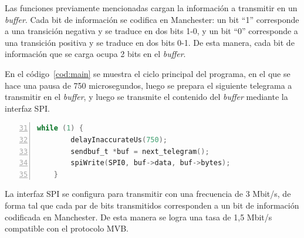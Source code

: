 Las funciones previamente mencionadas cargan la información a transmitir en un \textit{buffer}. Cada bit de información se codifica en Manchester: un bit ``1'' corresponde a una transición negativa y se traduce en dos bits 1-0, y un bit ``0'' corresponde a una transición positiva y se traduce en dos bits 0-1. De esta manera, cada bit de información que se carga ocupa 2 bits en el \textit{buffer}.

En el código~\ref{cod:main} se muestra el ciclo principal del programa, en el que se hace una pausa de 750 microsegundos, luego se prepara el siguiente telegrama a transmitir en el \textit{buffer}, y luego se transmite el contenido del \textit{buffer} mediante la interfaz SPI.

\begin{lstlisting}[label=cod:main,caption=Ciclo principal del programa (\texttt{main.c}).,float,numberstyle=\footnotesize\ttfamily,language=C,breaklines=true,numbers=left,firstnumber=31,xleftmargin=1cm]
    while (1) {
        delayInaccurateUs(750);
        sendbuf_t *buf = next_telegram();
        spiWrite(SPI0, buf->data, buf->bytes);
    }
\end{lstlisting}

La interfaz SPI se configura para transmitir con una frecuencia de 3 Mbit/s, de forma tal que cada par de bits transmitidos corresponden a un bit de información codificada en Manchester. De esta manera se logra una tasa de 1,5 Mbit/s compatible con el protocolo MVB.

